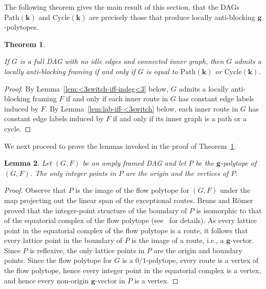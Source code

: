 \documentclass[12pt]{amsart}
\newtheorem{theorem}{Theorem}[section]
\newtheorem{lemma}[theorem]{Lemma}
\theoremstyle{definition}
\newcommand\bg{\mathbf{g}}
\newcommand\bk{\mathbf{k}}
\newcommand\Path{\mathrm{Path}}
\newcommand\Cycle{\mathrm{Cycle}}
\begin{document}
The following theorem gives the main result of this section, that the DAGs $\Path(\bk)$ and $\Cycle(\bk)$ are precisely those that produce locally anti-blocking $\bg$-polytopes.

\begin{theorem}\label{thm:lab-dag-characterization} 

If $G$ is a full DAG with no idle edges and connected inner graph, then $G$ admits a locally anti-blocking framing if and only if $G$ is equal to $\Path(\bk)$ or $\Cycle(\bk)$.
\end{theorem}

\begin{proof}
By Lemma~\ref{lem:<3switch-iff-indeg<3} below, $G$ admits a locally anti-blocking framing $F$ if and only if each inner route in $G$ has constant edge labels induced by $F$.
By Lemma~\ref{lem:lab-iff-<3switch} below, each inner route in $G$ has constant edge labels induced by $F$ if and only if its inner graph is a path or a cycle. 
\end{proof}

We next proceed to prove the lemmas invoked in the proof of Theorem~\ref{thm:lab-dag-characterization}.

\begin{lemma}\label{lem:daggpolytopeintegerpoints}
    Let $(G,F)$ be an amply framed DAG and let $P$ be the $\bg$-polytope of $(G,F)$. 
    The only integer points in $P$ are the origin and the vertices of $P$.
\end{lemma}

\begin{proof}
    Observe that $P$ is the image of the flow polytope for $(G,F)$ under the map projecting out the linear span of the exceptional routes.
    Bruns and R\"omer~\cite{BrunsRomer} proved that the integer-point structure of the boundary of $P$ is isomorphic to that of the equatorial complex of the flow polytope (see~\cite{BrunsRomer} for details).
    As every lattice point in the equatorial complex of the flow polytope is a route, it follows that every lattice point in the boundary of $P$ is the image of a route, i.e., a $\bg$-vector.
    Since $P$ is reflexive, the only lattice points in $P$ are the origin and boundary points.
    Since the flow polytope for $G$ is a $0/1$-polytope, every route is a vertex of the flow polytope, hence every integer point in the equatorial complex is a vertex, and hence every non-origin $\bg$-vector in $P$ is a vertex.
\end{proof}
\end{document}

